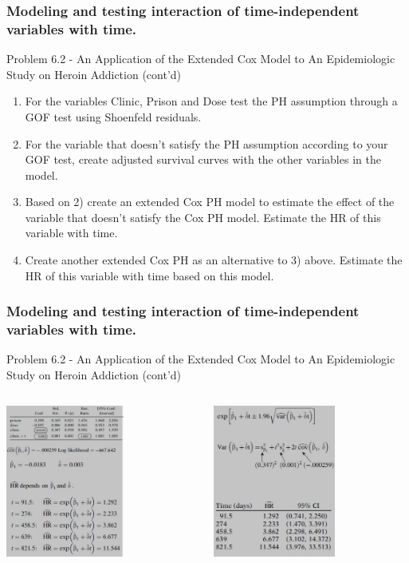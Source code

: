 \documentclass{beamer}
\theoremstyle{definition}
\begin{document}
\begin{frame}
\frametitle{Modeling and testing interaction of time-independent variables with time.}
\begin{block}{Problem 6.2 - An Application of the Extended Cox Model to An Epidemiologic Study on Heroin Addiction (cont'd)}
\begin{enumerate}
\item For the variables Clinic, Prison and Dose test the PH assumption through a GOF test using Shoenfeld residuals.
\item For the variable that doesn't satisfy the PH assumption according to your GOF test, create adjusted survival curves with the other variables in the model.
\item Based on 2) create an extended Cox PH model to estimate the effect of the variable that doesn't satisfy the Cox PH model. Estimate the HR of this variable with time.
\item Create another extended Cox PH as an alternative to 3) above. Estimate the HR of this variable with time based on this model.
\end{enumerate}
\end{block}
\end{frame}

\begin{frame}
\frametitle{Modeling and testing interaction of time-independent variables with time.}
\begin{block}{Problem 6.2 - An Application of the Extended Cox Model to An Epidemiologic Study on Heroin Addiction (cont'd)}
\begin{columns}
    \begin{column}{0.48\textwidth}
        \includegraphics[width =\textwidth, height=5cm]{CH6_P2.JPG}
    \end{column}
    \hspace{-10pt}
    \begin{column}{0.48\textwidth}
         \includegraphics[width =\textwidth, height=5cm]{CH6_P2a.JPG}
    \end{column}
\end{columns}
\end{block}
\end{frame}
\end{document}
